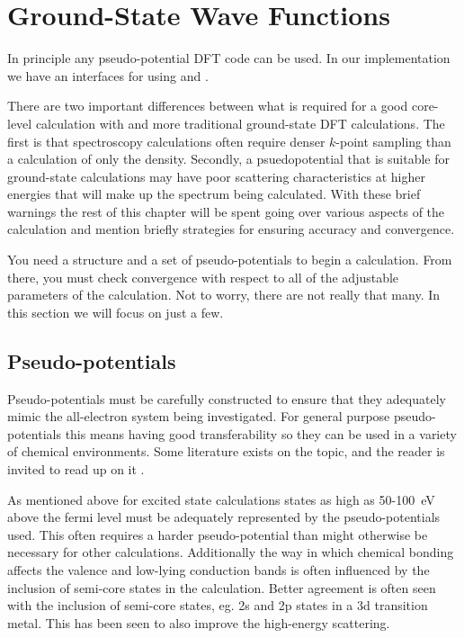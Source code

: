 \documentclass[11pt]{report}
\begin{document}
\chapter{Ground-State Wave Functions}
\label{ground_state}
In principle any pseudo-potential DFT code can be used. In our implementation we have an interfaces for using 
 \cite{abinit0,abinit1,abinit2,abinit3} and  \cite{espresso1,espresso2}. 

There are two important differences between what is required for a good core-level calculation with  and more traditional ground-state DFT calculations. The first is that spectroscopy calculations often require denser $k$-point sampling than a calculation of only the density. Secondly, a psuedopotential that is suitable for ground-state calculations may have poor scattering characteristics at higher energies that will make up the spectrum being calculated. With these brief warnings the rest of this chapter will be spent going over various aspects of the calculation and mention briefly strategies for ensuring accuracy and convergence.

You need a structure and a set of pseudo-potentials to begin a calculation. From there, you must check convergence with respect to all of the adjustable parameters of the calculation. Not to worry, there are not really that many. In this section we will focus on just a few.

\section{Pseudo-potentials}

Pseudo-potentials must be carefully constructed to ensure that they adequately mimic the all-electron system being investigated. For general purpose pseudo-potentials this means having good transferability so they can be used in a variety of chemical environments. Some literature exists on the topic, and the reader is invited to read up on it\cite{Psp} .

As mentioned above for excited state calculations states as high as 50-100~eV above the fermi level must be adequately represented by the pseudo-potentials used. This often requires a harder pseudo-potential than might otherwise be necessary for 
other calculations. Additionally the way in which chemical bonding affects the valence and low-lying conduction bands is often influenced by the inclusion of semi-core states in the calculation. Better agreement is often seen with the inclusion of semi-core states, eg. 2s and 2p states in a 3d transition metal. This has been seen to also improve the high-energy scattering.\cite{}
\end{document}
